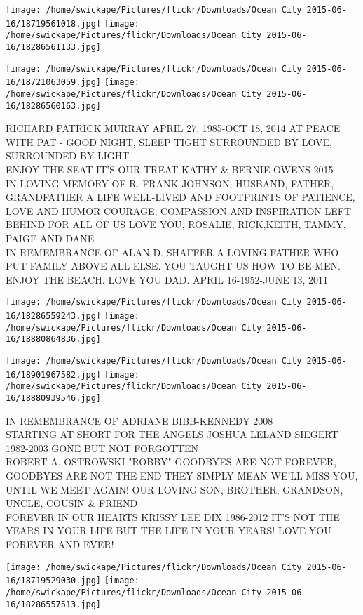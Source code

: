 \documentclass[10pt,letterpaper]{article}
\begin{document}
\texttt{[image: /home/swickape/Pictures/flickr/Downloads/Ocean City 2015-06-16/18719561018.jpg]}
\texttt{[image: /home/swickape/Pictures/flickr/Downloads/Ocean City 2015-06-16/18286561133.jpg]}

\texttt{[image: /home/swickape/Pictures/flickr/Downloads/Ocean City 2015-06-16/18721063059.jpg]}
\texttt{[image: /home/swickape/Pictures/flickr/Downloads/Ocean City 2015-06-16/18286560163.jpg]}

RICHARD PATRICK MURRAY APRIL 27, 1985{-}OCT 18, 2014 AT PEACE WITH PAT {-} GOOD NIGHT, SLEEP TIGHT SURROUNDED BY LOVE, SURROUNDED BY LIGHT\\
ENJOY THE SEAT IT'S OUR TREAT KATHY \& BERNIE OWENS 2015\\
IN LOVING MEMORY OF R. FRANK JOHNSON, HUSBAND, FATHER, GRANDFATHER A LIFE WELL{-}LIVED AND FOOTPRINTS OF PATIENCE, LOVE AND HUMOR COURAGE, COMPASSION AND INSPIRATION LEFT BEHIND FOR ALL OF US LOVE YOU, ROSALIE, RICK,KEITH, TAMMY, PAIGE AND DANE\\
IN REMEMBRANCE OF ALAN D. SHAFFER A LOVING FATHER WHO PUT FAMILY ABOVE ALL ELSE.  YOU TAUGHT US HOW TO BE MEN. ENJOY THE BEACH.  LOVE YOU DAD. APRIL 16{-}1952{-}JUNE 13, 2011
\pagebreak

\texttt{[image: /home/swickape/Pictures/flickr/Downloads/Ocean City 2015-06-16/18286559243.jpg]}
\texttt{[image: /home/swickape/Pictures/flickr/Downloads/Ocean City 2015-06-16/18880864836.jpg]}

\texttt{[image: /home/swickape/Pictures/flickr/Downloads/Ocean City 2015-06-16/18901967582.jpg]}
\texttt{[image: /home/swickape/Pictures/flickr/Downloads/Ocean City 2015-06-16/18880939546.jpg]}

IN REMEMBRANCE OF ADRIANE BIBB{-}KENNEDY 2008\\
STARTING AT SHORT FOR THE ANGELS JOSHUA LELAND SIEGERT 1982{-}2003 GONE BUT NOT FORGOTTEN\\
ROBERT A. OSTROWSKI "ROBBY" GOODBYES ARE NOT FOREVER, GOODBYES ARE NOT THE END THEY SIMPLY MEAN WE'LL MISS YOU, UNTIL WE MEET AGAIN!  OUR LOVING SON, BROTHER, GRANDSON, UNCLE, COUSIN \& FRIEND\\
FOREVER IN OUR HEARTS KRISSY LEE DIX 1986{-}2012 IT'S NOT THE YEARS IN YOUR LIFE BUT THE LIFE IN YOUR YEARS!  LOVE YOU FOREVER AND EVER!
\pagebreak

\texttt{[image: /home/swickape/Pictures/flickr/Downloads/Ocean City 2015-06-16/18719529030.jpg]}
\texttt{[image: /home/swickape/Pictures/flickr/Downloads/Ocean City 2015-06-16/18286557513.jpg]}
\end{document}
